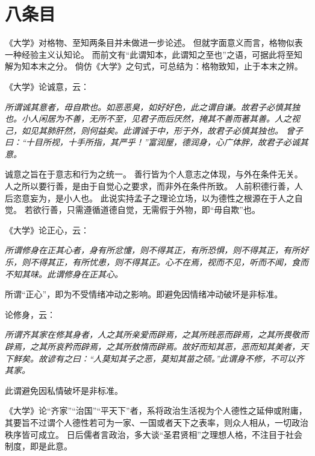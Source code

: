 \documentclass[11pt]{article}
\begin{document}
\section{八条目}
《大学》对格物、至知两条目并未做进一步论述。
但就字面意义而言，格物似表一种经验主义认知论。
而前文有“此谓知本，此谓知之至也”之语，可据此将至知解为知本末之分。
倘仿《大学》之句式，可总结为：格物致知，止于本末之辨。

\newline

《大学》论诚意，云：

\textit{所谓诚其意者，毋自欺也。如恶恶臭，如好好色，此之谓自谦。故君子必慎其独也。小人闲居为不善，无所不至，见君子而后厌然，掩其不善而著其善。人之视己，如见其肺肝然，则何益矣。此谓诚于中，形于外，故君子必慎其独也。 曾子曰：“十目所视，十手所指，其严乎！”富润屋，德润身，心广体胖，故君子必诚其意。}

诚意之旨在于意志和行为之统一。
善行皆为个人意志之体现，与外在条件无关。
人之所以要行善，是由于自觉心之要求，而非外在条件所致。
人前积德行善，人后恣意妄为，是小人也。
此说实持孟子之理论立场，以为德性之根源在于人之自觉。
若欲行善，只需遵循道德自觉，无需假于外物，即“毋自欺”也。

\newline

《大学》论正心，云：
  
\textit{所谓修身在正其心者，身有所忿懥，则不得其正，有所恐惧，则不得其正，有所好乐，则不得其正，有所忧患，则不得其正。心不在焉，视而不见，听而不闻，食而不知其味。此谓修身在正其心。}

所谓“正心”，即为不受情绪冲动之影响。即避免因情绪冲动破坏是非标准。

\newline

论修身，云：
  
\textit{所谓齐其家在修其身者，人之其所亲爱而辟焉，之其所贱恶而辟焉，之其所畏敬而辟焉，之其所哀矜而辟焉，之其所敖惰而辟焉。故好而知其恶，恶而知其美者，天下鲜矣。故谚有之曰：“人莫知其子之恶，莫知其苗之硕。”此谓身不修，不可以齐其家。}
  
此谓避免因私情破坏是非标准。

\newline

《大学》论“齐家”“治国”“平天下”者，系将政治生活视为个人德性之延伸或附庸，其要旨不过谓个人德性若可为一家、一国或者天下之表率，则众人相从，一切政治秩序皆可成立。
日后儒者言政治，多大谈“圣君贤相”之理想人格，不注目于社会制度，即是此意。 
\end{document}
